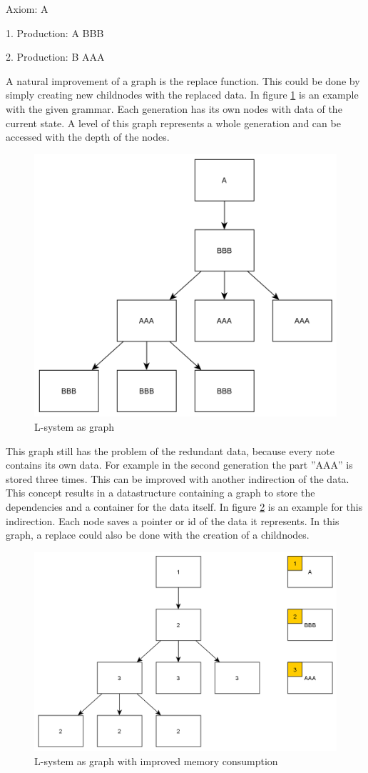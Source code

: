 \documentclass[english]{cpp-hmwk}
\begin{document}
Axiom: A

1. Production: A \rightarrow BBB

2. Production: B \rightarrow AAA

\medskip

\noindent A natural improvement of a graph is the replace function. This could be done by simply creating new childnodes with the replaced data. In figure \ref{figure:lsystem_graph} is an example with the given grammar. Each generation has its own nodes with data of the current state. A level of this graph represents a whole generation and can be accessed with the depth of the nodes.

\begin{figure}[h!]
	\centering
	\includegraphics[width=0.6\columnwidth]{../graphs/lsystem_graph_example.png}
	\caption{L-system as graph}
	\label{figure:lsystem_graph}
\end{figure}

\medskip

\noindent This graph still has the problem of the redundant data, because every note contains its own data. For example in the second generation the part ''AAA'' is stored three times. This can be improved with another indirection of the data. This concept results in a datastructure containing a graph to store the dependencies and a container for the data itself. In figure \ref{figure:lsystem_graph_mem_reduction} is an example for this indirection. Each node saves a pointer or id of the data it represents. In this graph, a replace could also be done with the creation of a childnodes.

\begin{figure}[h!]
	\centering
	\includegraphics[width=0.8\columnwidth]{../graphs/lsystem_graph_reduced_example.png}
	\caption{L-system as graph with improved memory consumption}
	\label{figure:lsystem_graph_mem_reduction}
\end{figure}
\end{document}
